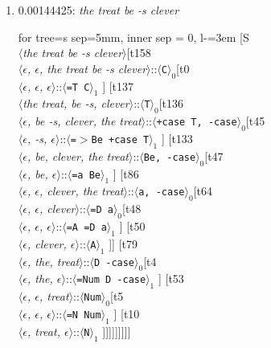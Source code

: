 \documentclass[11pt]{article}
\begin{document}
\begin{enumerate}
	\item  0.00144425: \textit{the treat be -s clever} \\[0.5em]
	\begin{adjustbox}{max width = \textwidth}
	\begin{forest}
	for tree={s sep=5mm, inner sep = 0, l-=3em}
	[S\\$\langle$\textit{the treat be -s clever}$\rangle$[t158\\$\langle$\textit{$\epsilon${,} $\epsilon${,} the treat be -s clever}$\rangle$::$\langle$\texttt{C}$\rangle_0$[t0\\$\langle$\textit{$\epsilon${,} $\epsilon${,} $\epsilon$}$\rangle$::$\langle$\texttt{{=}T C}$\rangle_1$ ] [t137\\$\langle$\textit{the treat{,} be -s{,} clever}$\rangle$::$\langle$\texttt{T}$\rangle_0$[t136\\$\langle$\textit{$\epsilon${,} be -s{,} clever{,} the treat}$\rangle$::$\langle$\texttt{+case T{,} -case}$\rangle_0$[t45\\$\langle$\textit{$\epsilon${,} -s{,} $\epsilon$}$\rangle$::$\langle$\texttt{{=}$>$Be +case T}$\rangle_1$ ] [t133\\$\langle$\textit{$\epsilon${,} be{,} clever{,} the treat}$\rangle$::$\langle$\texttt{Be{,} -case}$\rangle_0$[t47\\$\langle$\textit{$\epsilon${,} be{,} $\epsilon$}$\rangle$::$\langle$\texttt{{=}a Be}$\rangle_1$ ] [t86\\$\langle$\textit{$\epsilon${,} $\epsilon${,} clever{,} the treat}$\rangle$::$\langle$\texttt{a{,} -case}$\rangle_0$[t64\\$\langle$\textit{$\epsilon${,} $\epsilon${,} clever}$\rangle$::$\langle$\texttt{{=}D a}$\rangle_0$[t48\\$\langle$\textit{$\epsilon${,} $\epsilon${,} $\epsilon$}$\rangle$::$\langle$\texttt{{=}A {=}D a}$\rangle_1$ ] [t50\\$\langle$\textit{$\epsilon${,} clever{,} $\epsilon$}$\rangle$::$\langle$\texttt{A}$\rangle_1$ ]] [t79\\$\langle$\textit{$\epsilon${,} the{,} treat}$\rangle$::$\langle$\texttt{D -case}$\rangle_0$[t4\\$\langle$\textit{$\epsilon${,} the{,} $\epsilon$}$\rangle$::$\langle$\texttt{{=}Num D -case}$\rangle_1$ ] [t53\\$\langle$\textit{$\epsilon${,} $\epsilon${,} treat}$\rangle$::$\langle$\texttt{Num}$\rangle_0$[t5\\$\langle$\textit{$\epsilon${,} $\epsilon${,} $\epsilon$}$\rangle$::$\langle$\texttt{{=}N Num}$\rangle_1$ ] [t10\\$\langle$\textit{$\epsilon${,} treat{,} $\epsilon$}$\rangle$::$\langle$\texttt{N}$\rangle_1$ ]]]]]]]]]

\end{forest}
\end{adjustbox}
\end{enumerate}
\end{document}
